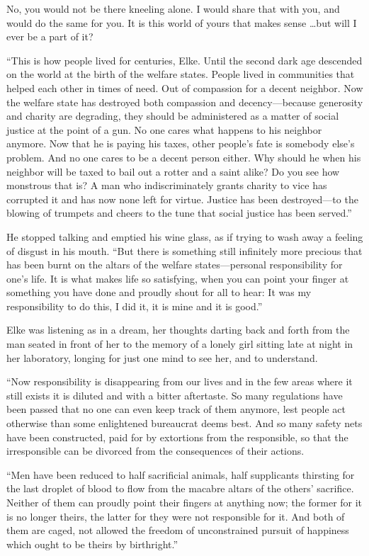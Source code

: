 No, you would not be there kneeling alone. I would share that with you, and would do the same for you. It is this world of yours that makes sense \ldots but will I ever be a part of it?

``This is how people lived for centuries, Elke. Until the second dark age descended on the world at the birth of the welfare states. People lived in communities that helped each other in times of need. Out of compassion for a decent neighbor. Now the welfare state has destroyed both compassion and decency---because generosity and charity are degrading, they should be administered as a matter of social justice at the point of a gun. No one cares what happens to his neighbor anymore. Now that he is paying his taxes, other people's fate is somebody else's problem. And no one cares to be a decent person either. Why should he when his neighbor will be taxed to bail out a rotter and a saint alike? Do you see how monstrous that is? A man who indiscriminately grants charity to vice has corrupted it and has now none left for virtue. Justice has been destroyed---to the blowing of trumpets and cheers to the tune that social justice has been served.''

He stopped talking and emptied his wine glass, as if trying to wash away a feeling of disgust in his mouth. ``But there is something still infinitely more precious that has been burnt on the altars of the welfare states---personal responsibility for one's life. It is what makes life so satisfying, when you can point your finger at something you have done and proudly shout for all to hear: It was my responsibility to do this, I did it, it is mine and it is good.''

Elke was listening as in a dream, her thoughts darting back and forth from the man seated in front of her to the memory of a lonely girl sitting late at night in her laboratory, longing for just one mind to see her, and to understand.

``Now responsibility is disappearing from our lives and in the few areas where it still exists it is diluted and with a bitter aftertaste. So many regulations have been passed that no one can even keep track of them anymore, lest people act otherwise than some enlightened bureaucrat deems best. And so many safety nets have been constructed, paid for by extortions from the responsible, so that the irresponsible can be divorced from the consequences of their actions.

``Men have been reduced to half sacrificial animals, half supplicants thirsting for the last droplet of blood to flow from the macabre altars of the others' sacrifice. Neither of them can proudly point their fingers at anything now; the former for it is no longer theirs, the latter for they were not responsible for it. And both of them are caged, not allowed the freedom of unconstrained pursuit of happiness which ought to be theirs by birthright.''

